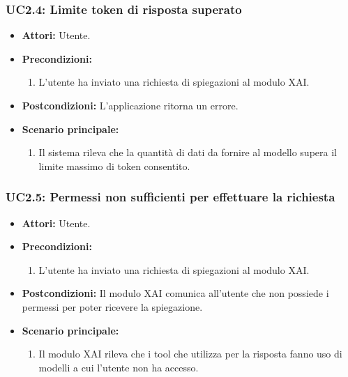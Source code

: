 \subsubsection{UC2.4: Limite token di risposta superato}
    \label{uc:uc2.4}
    \begin{itemize}
        \item \textbf{Attori:} Utente.
        \item \textbf{Precondizioni:} 
            \begin{enumerate}
                \item L'utente ha inviato una richiesta di spiegazioni al modulo XAI.
            \end{enumerate}
        \item \textbf{Postcondizioni:} L'applicazione ritorna un errore.
        \item \textbf{Scenario principale:}
            \begin{enumerate}
                \item Il sistema rileva che la quantità di dati da fornire al modello supera il limite massimo di token consentito.
            \end{enumerate}
    \end{itemize}


\subsubsection{UC2.5: Permessi non sufficienti per effettuare la richiesta}
    \label{uc:uc2.5}
    \begin{itemize}
        \item \textbf{Attori:} Utente.
        \item \textbf{Precondizioni:}
            \begin{enumerate}
                \item L'utente ha inviato una richiesta di spiegazioni al modulo XAI.
            \end{enumerate}
        \item \textbf{Postcondizioni:} Il modulo XAI comunica all'utente che non possiede i permessi per poter ricevere la spiegazione.
        \item \textbf{Scenario principale:}
            \begin{enumerate}
                \item Il modulo XAI rileva che i tool che utilizza per la risposta fanno uso di modelli a cui l'utente non ha accesso.
            \end{enumerate}
    \end{itemize}

